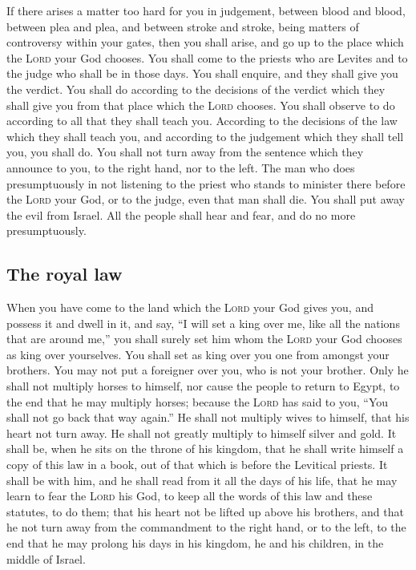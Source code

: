  If there arises a matter too hard for you in judgement,
between blood and blood, between plea and plea, and between stroke and
stroke, being matters of controversy within your gates, then you shall
arise, and go up to the place which the \textsc{Lord} your God chooses.
 You shall come to the priests who are Levites and to the
judge who shall be in those days. You shall enquire, and they shall give
you the verdict.  You shall do according to the decisions
of the verdict which they shall give you from that place which the
\textsc{Lord} chooses. You shall observe to do according to all that
they shall teach you.  According to the decisions of the
law which they shall teach you, and according to the judgement which
they shall tell you, you shall do. You shall not turn away from the
sentence which they announce to you, to the right hand, nor to the left.
 The man who does presumptuously in not listening to the
priest who stands to minister there before the \textsc{Lord} your God,
or to the judge, even that man shall die. You shall put away the evil
from Israel.  All the people shall hear and fear, and do
no more presumptuously.

\hypertarget{the-royal-law}{%
\subsection{The royal law}\label{the-royal-law}}

 When you have come to the land which the \textsc{Lord}
your God gives you, and possess it and dwell in it, and say, ``I will
set a king over me, like all the nations that are around me,''
 you shall surely set him whom the \textsc{Lord} your God
chooses as king over yourselves. You shall set as king over you one from
amongst your brothers. You may not put a foreigner over you, who is not
your brother.  Only he shall not multiply horses to
himself, nor cause the people to return to Egypt, to the end that he may
multiply horses; because the \textsc{Lord} has said to you, ``You shall
not go back that way again.''  He shall not multiply
wives to himself, that his heart not turn away. He shall not greatly
multiply to himself silver and gold.  It shall be, when
he sits on the throne of his kingdom, that he shall write himself a copy
of this law in a book, out of that which is before the Levitical
priests.  It shall be with him, and he shall read from it
all the days of his life, that he may learn to fear the \textsc{Lord}
his God, to keep all the words of this law and these statutes, to do
them;  that his heart not be lifted up above his
brothers, and that he not turn away from the commandment to the right
hand, or to the left, to the end that he may prolong his days in his
kingdom, he and his children, in the middle of Israel.

